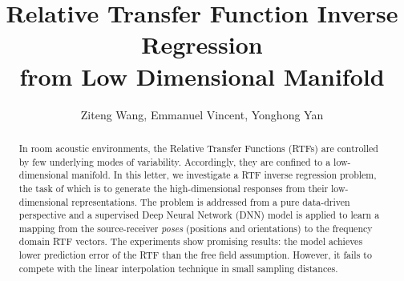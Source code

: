 \documentclass[journal]{IEEEtran}
\begin{document}
\title{Relative Transfer Function Inverse Regression \\ from Low Dimensional Manifold}

\author{Ziteng Wang, Emmanuel Vincent, Yonghong Yan}%

%



\maketitle

\begin{abstract}
In room acoustic environments, the Relative Transfer Functions (RTFs) are controlled by few underlying modes of variability. Accordingly, they are confined to a low-dimensional manifold. In this letter, we investigate a RTF inverse regression problem, the task of which is to generate the high-dimensional responses from their low-dimensional representations. The problem is addressed from a pure data-driven perspective and a supervised Deep Neural Network (DNN) model is applied to learn a mapping from the source-receiver \emph{poses} (positions and orientations) to the frequency domain RTF vectors. The experiments show promising results: the model achieves lower prediction error of the RTF than the free field assumption. However, it fails to compete with the linear interpolation technique in small sampling distances.
\end{abstract}
\end{document}
